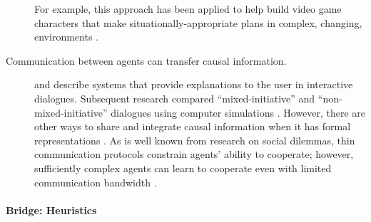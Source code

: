 \begin{description}
  For example, this approach has been applied to help build video game
  characters that make situationally-appropriate plans in complex,
  changing, environments \cite{hawes2001anytime}.
\item[Communication between agents can transfer causal information.]
  \citet{moore1995participating} and \citet{cawsey1992explanation}
  describe systems that provide explanations to the user in
  interactive dialogues.  Subsequent research compared
  ``mixed-initiative'' and ``non-mixed-initiative'' dialogues using
  computer simulations \cite{ishizaki1999exploring}.  However, there
  are other ways to share and integrate causal information when it has
  formal representations \cite{GeiHofSch16}.  As is well known from
  research on social dilemmas, thin communication protocols constrain
  agents' ability to cooperate; however, sufficiently complex agents
  can learn to cooperate even with limited communication bandwidth
  \cite{leibo2017multi}.
\end{description}                        

\paragraph{\textbf{\upshape Bridge: Heuristics}} 
                                         
